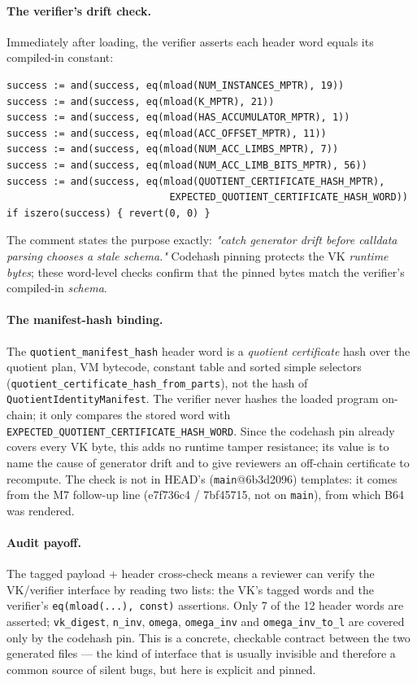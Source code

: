 \paragraph{The verifier's drift check.} Immediately after loading,
the verifier asserts each header word equals its compiled-in constant:
\begin{lstlisting}[style=yul]
success := and(success, eq(mload(NUM_INSTANCES_MPTR), 19))
success := and(success, eq(mload(K_MPTR), 21))
success := and(success, eq(mload(HAS_ACCUMULATOR_MPTR), 1))
success := and(success, eq(mload(ACC_OFFSET_MPTR), 11))
success := and(success, eq(mload(NUM_ACC_LIMBS_MPTR), 7))
success := and(success, eq(mload(NUM_ACC_LIMB_BITS_MPTR), 56))
success := and(success, eq(mload(QUOTIENT_CERTIFICATE_HASH_MPTR),
                            EXPECTED_QUOTIENT_CERTIFICATE_HASH_WORD))
if iszero(success) { revert(0, 0) }
\end{lstlisting}
The comment states the purpose exactly: \emph{"catch generator drift
before calldata parsing chooses a stale schema."} Codehash pinning
protects the VK \emph{runtime bytes}; these word-level checks confirm
that the pinned bytes match the verifier's compiled-in \emph{schema}.

\paragraph{The manifest-hash binding.}  The
\texttt{quotient\_\allowbreak{}manifest\_\allowbreak{}hash} header word is a \emph{quotient
certificate} hash over the quotient plan, VM bytecode, constant table and
sorted simple selectors (\texttt{quotient\_\allowbreak{}certificate\_\allowbreak{}hash\_\allowbreak{}from\_\allowbreak{}parts}),
not the hash of \texttt{QuotientIdentityManifest}. The verifier never
hashes the loaded program on-chain; it only compares the stored word with
\texttt{EXPECTED\_\allowbreak{}QUOTIENT\_\allowbreak{}CERTIFICATE\_\allowbreak{}HASH\_\allowbreak{}WORD}. Since the codehash
pin already covers every VK byte, this adds no runtime tamper
resistance; its value is to name the cause of generator drift and to
give reviewers an off-chain certificate to recompute. The check is not
in HEAD's (\texttt{main}@6b3d2096) templates: it comes from the M7
follow-up line (e7f736c4 / 7bf45715, not on \texttt{main}), from which B64
was rendered.

\paragraph{Audit payoff.} The tagged payload + header cross-check
means a reviewer can verify the VK/verifier interface by
reading two lists: the VK's tagged words and the verifier's
\texttt{eq(mload(...), const)} assertions. Only 7 of the 12 header words
are asserted; \texttt{vk\_digest}, \texttt{n\_inv}, \texttt{omega},
\texttt{omega\_inv} and \texttt{omega\_inv\_to\_l} are covered only by
the codehash pin. This is a concrete, checkable contract between the two
generated files --- the kind of interface that is usually invisible and
therefore a common source of silent bugs, but here is explicit and
pinned.

